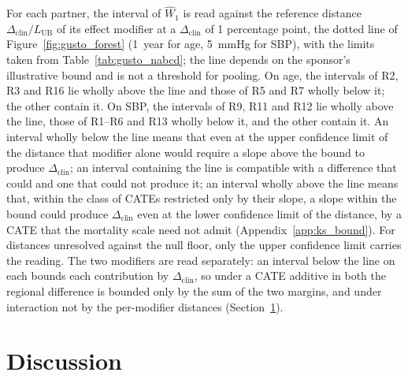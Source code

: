 \documentclass[AMA,Times1COL]{WileyNJDv5}
\begin{document}
For each partner, the interval of $\widehat{W}_1$ is read against the reference distance $\Delta_{\text{clin}} / L_{\text{UB}}$ of its effect modifier at a $\Delta_{\text{clin}}$ of 1 percentage point, the dotted line of Figure~\ref{fig:gusto_forest} (1~year for age, 5~mmHg for SBP), with the limits taken from Table~\ref{tab:gusto_nabcd}; the line depends on the sponsor's illustrative bound and is not a threshold for pooling. On age, the intervals of R2, R3 and R16 lie wholly above the line and those of R5 and R7 wholly below it; the other  contain it. On SBP, the intervals of R9, R11 and R12 lie wholly above the line, those of R1--R6 and R13 wholly below it, and the other  contain it. An interval wholly below the line means that even at the upper confidence limit of the distance that modifier alone would require a slope above the bound to produce $\Delta_{\text{clin}}$; an interval containing the line is compatible with a difference that could and one that could not produce it; an interval wholly above the line means that, within the class of CATEs restricted only by their slope, a slope within the bound could produce $\Delta_{\text{clin}}$ even at the lower confidence limit of the distance, by a CATE that the mortality scale need not admit (Appendix~\ref{app:ks_bound}). For distances unresolved against the null floor, only the upper confidence limit carries the reading. The two modifiers are read separately: an interval below the line on each bounds each contribution by $\Delta_{\text{clin}}$, so under a CATE additive in both the regional difference is bounded only by the sum of the two margins, and under interaction not by the per-modifier distances (Section~\ref{sec:discussion}).

\section{Discussion}\label{sec:discussion}
\end{document}
